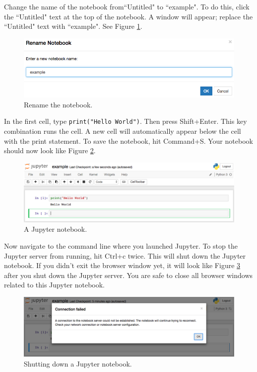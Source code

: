 \documentclass[11pt,a4paper]{article}
\begin{document}
Change the name of the notebook from``Untitled" to ``example".
To do this, click the ``Untitled" text at the top of the notebook.
A window will appear; replace the ``Untitled" text with ``example".
See Figure \ref{fig:rename-notebook}.

\begin{figure}[h!]
\centering
\includegraphics[width=.7\textwidth]{figures/rename_notebook.png}
\caption{Rename the notebook.}
\label{fig:rename-notebook}
\end{figure}

In the first cell, type \texttt{print("Hello World")}.
Then press Shift+Enter.
This key combination runs the cell.
A new cell will automatically appear below the cell with the print statement.
To save the notebook, hit Command+S.
Your notebook should now look like Figure \ref{fig:example-notebook}.

\begin{figure}[h!]
\centering
\includegraphics[width=.7\textwidth]{figures/example_notebook.png}
\caption{A Jupyter notebook.}
\label{fig:example-notebook}
\end{figure}

Now navigate to the command line where you launched Jupyter.
To stop the Jupyter server from running, hit Ctrl+c twice.
This will shut down the Jupyter notebook.
If you didn't exit the browser window yet, it will look like Figure \ref{fig:jupyter-shutdown} after you shut down the Jupyter server.
You are safe to close all browser windows related to this Jupyter notebook.

\begin{figure}[h!]
\centering
\includegraphics[width=.7\textwidth]{figures/jupyter_shutdown.png}
\caption{Shutting down a Jupyter notebook.}
\label{fig:jupyter-shutdown}
\end{figure}
\end{document}
